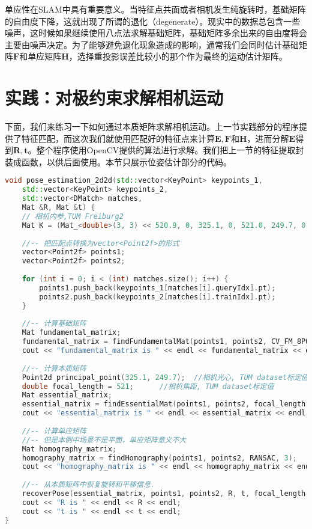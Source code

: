 单应性在SLAM中具有重要意义。当特征点共面或者相机发生纯旋转时，基础矩阵的自由度下降，这就出现了所谓的退化（degenerate）。现实中的数据总包含一些噪声，这时候如果继续使用八点法求解基础矩阵，基础矩阵多余出来的自由度将会主要由噪声决定。为了能够避免退化现象造成的影响，通常我们会同时估计基础矩阵$\bm{F}$和单应矩阵$\bm{H}$，选择重投影误差比较小的那个作为最终的运动估计矩阵。

\section{实践：对极约束求解相机运动}
下面，我们来练习一下如何通过本质矩阵求解相机运动。上一节实践部分的程序提供了特征匹配，而这次我们就使用匹配好的特征点来计算$\bm{E}, \bm{F}$和$\bm{H}$，进而分解$\bm{E}$得到$\bm{R}, \bm{t}$。整个程序使用OpenCV提供的算法进行求解。我们把上一节的特征提取封装成函数，以供后面使用。本节只展示位姿估计部分的代码。

\begin{lstlisting}[language=c++,caption=slambook2/ch7/pose_estimation_2d2d.cpp （片段）]
void pose_estimation_2d2d(std::vector<KeyPoint> keypoints_1,
    std::vector<KeyPoint> keypoints_2,
    std::vector<DMatch> matches,
    Mat &R, Mat &t) {
    // 相机内参,TUM Freiburg2
    Mat K = (Mat_<double>(3, 3) << 520.9, 0, 325.1, 0, 521.0, 249.7, 0, 0, 1);
    
    //-- 把匹配点转换为vector<Point2f>的形式
    vector<Point2f> points1;
    vector<Point2f> points2;
    
    for (int i = 0; i < (int) matches.size(); i++) {
        points1.push_back(keypoints_1[matches[i].queryIdx].pt);
        points2.push_back(keypoints_2[matches[i].trainIdx].pt);
    }
    
    //-- 计算基础矩阵
    Mat fundamental_matrix;
    fundamental_matrix = findFundamentalMat(points1, points2, CV_FM_8POINT);
    cout << "fundamental_matrix is " << endl << fundamental_matrix << endl;
    
    //-- 计算本质矩阵
    Point2d principal_point(325.1, 249.7);  //相机光心, TUM dataset标定值
    double focal_length = 521;      //相机焦距, TUM dataset标定值
    Mat essential_matrix;
    essential_matrix = findEssentialMat(points1, points2, focal_length, principal_point);
    cout << "essential_matrix is " << endl << essential_matrix << endl;
    
    //-- 计算单应矩阵
    //-- 但是本例中场景不是平面，单应矩阵意义不大
    Mat homography_matrix;
    homography_matrix = findHomography(points1, points2, RANSAC, 3);
    cout << "homography_matrix is " << endl << homography_matrix << endl;
    
    //-- 从本质矩阵中恢复旋转和平移信息.
    recoverPose(essential_matrix, points1, points2, R, t, focal_length, principal_point);
    cout << "R is " << endl << R << endl;
    cout << "t is " << endl << t << endl;
}
\end{lstlisting}

